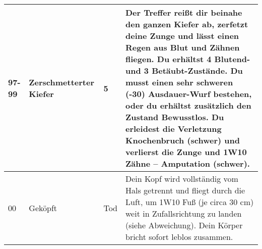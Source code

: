 \documentclass[a4paper, fontsize=8.5pt]{scrartcl}
\begin{document}
\begin{table}[!ht]
\begin{tabularx}{\textwidth}{lp{2.5cm}lX}
        97-99         & Zerschmetterter Kiefer  & 5           & Der Treffer reißt dir beinahe den ganzen Kiefer ab, zerfetzt deine Zunge und lässt einen Regen aus Blut und Zähnen fliegen. Du erhältst 4 Blutend- und 3 Betäubt-Zustände. Du musst einen sehr schweren (-30) Ausdauer-Wurf bestehen, oder du erhältst zusätzlich den Zustand Bewusstlos. Du erleidest die Verletzung Knochenbruch (schwer) und verlierst die Zunge und 1W10 Zähne – Amputation (schwer).                                     \\ \hline
        00            & Geköpft                 & Tod         & Dein Kopf wird vollständig vom Hals getrennt und fliegt durch die Luft, um 1W10 Fuß (je circa 30 cm) weit in Zufallsrichtung zu landen (siehe Abweichung). Dein Körper bricht sofort leblos zusammen.
    \end{tabularx}

\end{table}
\pagebreak
\end{document}
